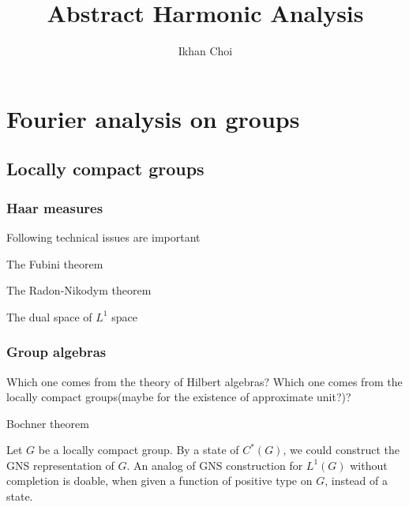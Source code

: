 \documentclass{../../large}
\begin{document}
\title{Abstract Harmonic Analysis}
\author{Ikhan Choi}
\maketitle
\tableofcontents



\part{Fourier analysis on groups}

\chapter{Locally compact groups}
\section{Haar measures}

\begin{prb}
Following technical issues are important
\begin{parts}
\item The Fubini theorem
\item The Radon-Nikodym theorem
\item The dual space of $L^1$ space
\end{parts}
\end{prb}

\begin{prb}
\end{prb}




\section{Group algebras}

Which one comes from the theory of Hilbert algebras?
Which one comes from the locally compact groups(maybe for the existence of approximate unit?)?

\begin{prb}
\end{prb}
\begin{prb}[Convolution]
\end{prb}
\begin{prb}
Bochner theorem
\end{prb}
\begin{prb}
\end{prb}
\begin{prb}
Let $G$ be a locally compact group.
By a state of $C^*(G)$, we could construct the GNS representation of $G$.
An analog of GNS construction for $L^1(G)$ without completion is doable, when given a function of positive type on $G$, instead of a state.
\end{prb}
\end{document}
